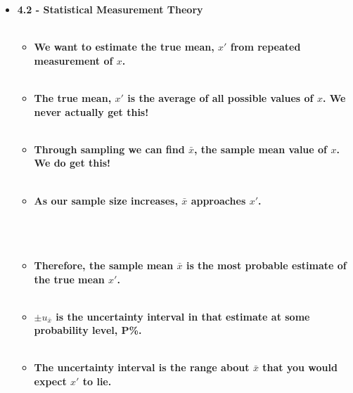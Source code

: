 \documentclass[11pt]{article}
\newcommand{\B}{\color{blue}}
\newcommand{\G}{\color{mygreen}}
\newcommand{\PR}{\color{mypurple}}
\begin{document}
\begin{itemize}



		
	\item \textbf{ \LARGE 4.2 -  Statistical Measurement Theory  } \\\\
	\begin{itemize}

		\item \textbf{ \Large We want to estimate the {\bf \B true mean}, $x'$ from repeated measurement of $x$.} \\\\ 
		
		\item \textbf{ \Large The {\bf \B true mean}, $x'$ is the average of all possible values of $x$. We never actually get this!} \\\\ 
		
		\item \textbf{ \Large Through sampling we can find $\bar{x}$, the {\bf \G sample mean} value of $x$. We do get this!} \\\\ 
		
		\item \textbf{ \Large As our sample size increases, $\bar{x}$ approaches $x'$. } \\\\ 
		
		\\\\
		
		\item \textbf{ \Large Therefore, the sample mean $\bar{x}$ is the most probable estimate of the true mean $x'$. } \\\\ 
		
		\item \textbf{ \Large $\pm u_{\bar{x}}$ is the {\bf \PR uncertainty interval} in that estimate at some probability level, P\%. } \\\\ 
	
	         \item \textbf{ \Large The  {\bf \PR uncertainty interval} is the range about $\bar{x}$ that you would expect $x'$ to lie. } \\\\
		

\end{itemize}
\end{itemize}
\end{document}

